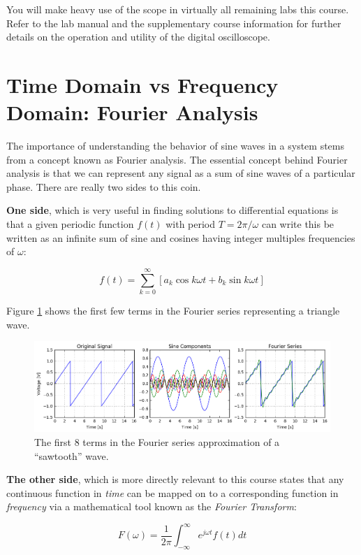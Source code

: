 \documentclass{tufte-book}
\begin{document}
You will make heavy use of the scope in virtually all remaining labs this course. Refer to the lab manual and the supplementary course information for further details on the operation and utility of the digital oscilloscope.

\section{Time Domain vs Frequency Domain: Fourier Analysis}\label{sec:fourier}
The importance of understanding the behavior of sine waves in a system stems from a concept known as Fourier analysis. The essential concept behind Fourier analysis is that we can represent any signal as a sum of sine waves of a particular phase. There are really two sides to this coin. 

\textbf{One side}, which is very useful in finding solutions to differential equations is that a given periodic function $f(t)$ with period $T= 2\pi/\omega$ can write this be written as an infinite sum of sine and cosines having integer multiples frequencies of $\omega$:

$$
f(t) = \sum_{k=0}^\infty\left[a_k\cos k\omega t + b_k\sin k\omega t\right]
$$

\noindent Figure \ref{fig:FourierSeries} shows the first few terms in the Fourier series representing a triangle wave.

\begin{figure}[h]
\caption{The first 8 terms in the Fourier series approximation of a ``sawtooth'' wave.}
\label{fig:FourierSeries}
\begin{center}
\includegraphics[width=13cm]{FourierSeries.png}
\end{center}
\end{figure}

\textbf{The other side}, which is more directly relevant to this course states that any continuous function in \textit{time} can be mapped on to a corresponding function in \textit{frequency} via a mathematical tool known as the \textit{Fourier Transform}:

\begin{equation}\label{def:fouriertransform}
F(\omega) = \frac{1}{2\pi}\int_{-\infty}^{\infty}e^{j\omega t}f(t)dt
\end{equation}
\end{document}
